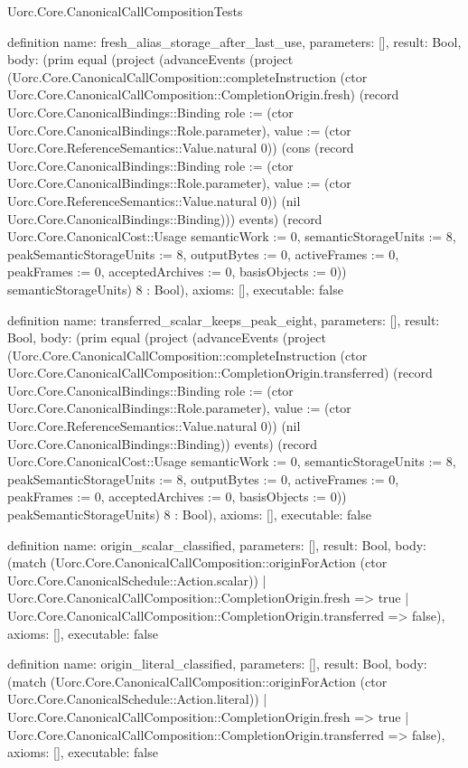 \begin{lexlean}{Uorc.Core.CanonicalCallCompositionTests}
\begin{semanticmodule}
definition{
  name: fresh_alias_storage_after_last_use,
  parameters: [],
  result: Bool,
  body: (prim equal (project (advanceEvents (project (Uorc.Core.CanonicalCallComposition::completeInstruction (ctor Uorc.Core.CanonicalCallComposition::CompletionOrigin.fresh) (record Uorc.Core.CanonicalBindings::Binding {role := (ctor Uorc.Core.CanonicalBindings::Role.parameter), value := (ctor Uorc.Core.ReferenceSemantics::Value.natural 0)}) (cons (record Uorc.Core.CanonicalBindings::Binding {role := (ctor Uorc.Core.CanonicalBindings::Role.parameter), value := (ctor Uorc.Core.ReferenceSemantics::Value.natural 0)}) (nil Uorc.Core.CanonicalBindings::Binding))) events) (record Uorc.Core.CanonicalCost::Usage {semanticWork := 0, semanticStorageUnits := 8, peakSemanticStorageUnits := 8, outputBytes := 0, activeFrames := 0, peakFrames := 0, acceptedArchives := 0, basisObjects := 0})) semanticStorageUnits) 8 : Bool),
  axioms: [],
  executable: false
}

definition{
  name: transferred_scalar_keeps_peak_eight,
  parameters: [],
  result: Bool,
  body: (prim equal (project (advanceEvents (project (Uorc.Core.CanonicalCallComposition::completeInstruction (ctor Uorc.Core.CanonicalCallComposition::CompletionOrigin.transferred) (record Uorc.Core.CanonicalBindings::Binding {role := (ctor Uorc.Core.CanonicalBindings::Role.parameter), value := (ctor Uorc.Core.ReferenceSemantics::Value.natural 0)}) (nil Uorc.Core.CanonicalBindings::Binding)) events) (record Uorc.Core.CanonicalCost::Usage {semanticWork := 0, semanticStorageUnits := 8, peakSemanticStorageUnits := 8, outputBytes := 0, activeFrames := 0, peakFrames := 0, acceptedArchives := 0, basisObjects := 0})) peakSemanticStorageUnits) 8 : Bool),
  axioms: [],
  executable: false
}

definition{
  name: origin_scalar_classified,
  parameters: [],
  result: Bool,
  body: (match (Uorc.Core.CanonicalCallComposition::originForAction (ctor Uorc.Core.CanonicalSchedule::Action.scalar))
    | Uorc.Core.CanonicalCallComposition::CompletionOrigin.fresh => true
    | Uorc.Core.CanonicalCallComposition::CompletionOrigin.transferred => false),
  axioms: [],
  executable: false
}

definition{
  name: origin_literal_classified,
  parameters: [],
  result: Bool,
  body: (match (Uorc.Core.CanonicalCallComposition::originForAction (ctor Uorc.Core.CanonicalSchedule::Action.literal))
    | Uorc.Core.CanonicalCallComposition::CompletionOrigin.fresh => true
    | Uorc.Core.CanonicalCallComposition::CompletionOrigin.transferred => false),
  axioms: [],
  executable: false
}


\end{semanticmodule}
\end{lexlean}

